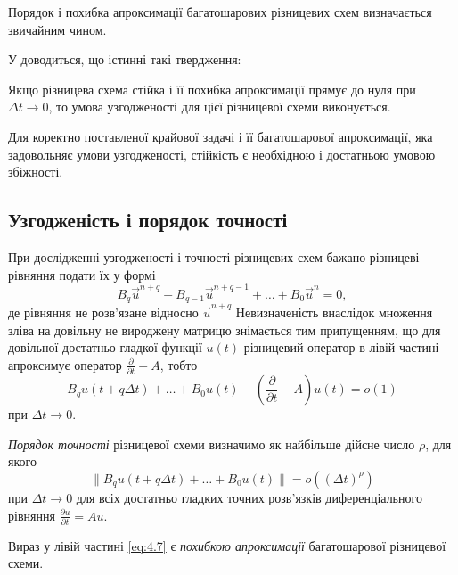Порядок і похибка апроксимації багатошарових різницевих схем визначається звичайним чином. \medskip

У \cite{richtmyer1972} доводиться, що істинні такі твердження:
\begin{proposition}
    Якщо різницева схема стійка і її похибка апроксимації прямує до нуля при $\Delta t \to 0$, то умова узгодженості для цієї різницевої схеми виконується.
\end{proposition}
	
\begin{proposition}
    Для коректно поставленої крайової задачі і її багатошарової апроксимації, яка задовольняє умови узгодженості, стійкість є необхідною і достатньою умовою збіжності.
\end{proposition}

\subsection{Узгодженість і порядок точності}

При дослідженні узгодженості і точності різницевих схем бажано різницеві рівняння подати їх у формі 
\begin{equation}
    B_q \vec u^{n + q} + B_{q - 1} \vec u^{n + q - 1} + \ldots + B_0 \vec u^n = 0,
\end{equation}
де рівняння не розв'язане відносно $\vec u^{n + q}$ Невизначеність внаслідок множення зліва на довільну не вироджену матрицю знімається тим припущенням, що для довільної достатньо гладкої функції $u(t)$ різницевий оператор в лівій частині апроксимує оператор $\frac{\partial}{\partial t} - A$, тобто
\begin{equation}
    B_q u(t + q \Delta t) + \ldots + B_0 u(t) - \left(\frac{\partial}{\partial t} - A \right) u(t) = o(1)
\end{equation}
при $\Delta t \to 0$. \medskip
 
\begin{definition}
    \textit{Порядок точності} різницевої схеми визначимо як найбільше дійсне число $\rho$, для якого 
    \begin{equation}
        \label{eq:4.7}
        \| B_q u(t + q \Delta t) + \ldots + B_0 u(t) \| = o((\Delta t)^\rho)
    \end{equation}
    при $\Delta t \to 0$ для всіх достатньо гладких точних розв'язків диференціального рівняння $\frac{\partial u}{\partial t} = A u$.
\end{definition}

\begin{definition}
    Вираз у лівій частині \eqref{eq:4.7} є \textit{похибкою апроксимації} багатошарової різницевої схеми.
\end{definition}


